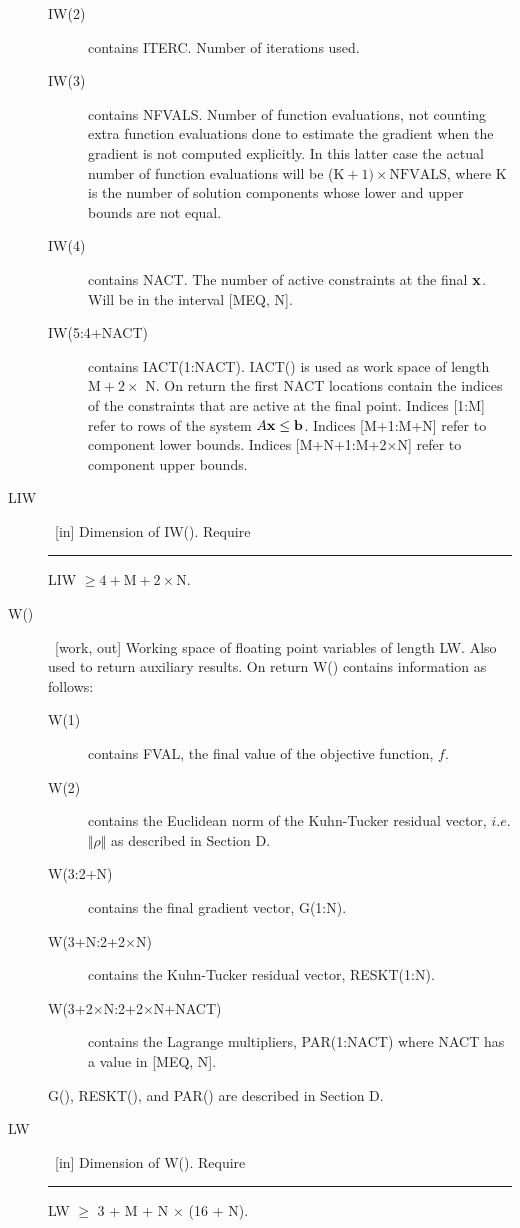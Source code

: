 \documentclass[twoside]{MATH77}
\begin{document}
\begin{description}
\begin{description}
\item[IW(2)]  contains ITERC. Number of iterations used.

\item[IW(3)]  contains NFVALS. Number of function evaluations, not counting
extra function evaluations done to estimate the gradient when the gradient
is not computed explicitly. In this latter case the actual number of
function evaluations will be ($\text{K}+1)\times \text{NFVALS}$, where K is the number
of solution components whose lower and upper bounds are not equal.

\item[IW(4)]  contains NACT. The number of active constraints at the final
${\bf x}$. Will be in the interval [MEQ, N].

\item[IW(5:4+NACT)]  contains IACT(1:NACT).\newline
IACT() is used as work space of length $\text{M} +2\times $ N. On return
the first NACT locations contain the
indices of the constraints that are active at the final point. Indices [1:M]
refer to rows of the system $A{\bf x} \leq  {\bf b}$. Indices [M+1:M+N]
refer to component lower bounds. Indices [M+N+1:M+2$\times $N] refer to
component upper bounds.
\end{description}

\item[LIW]  \ [in] Dimension of IW(). Require\newline
\rule{.4in}{0pt} LIW $\geq  4 + \text{M} + 2 \times \text{N}$.

\item[W()]  \ [work, out] Working space of floating point variables of
length LW. Also used to return auxiliary results. On return W() contains
information as follows:
\begin{description}
\item[W(1)] contains FVAL, the final value of the objective function, $f.$

\item[W(2)] contains the Euclidean norm of the Kuhn-Tucker residual vector, $i.e$. $%
\Vert \rho \Vert $ as described in Section D.

\item[W(3:2+N)] contains the final gradient vector, G(1:N).

\item[W(3+N:2+2$\times $N)] contains the Kuhn-Tucker residual vector, RESKT(1:N).

\item[W(3+2$\times $N:2+2$\times $N+NACT)] contains the Lagrange multipliers,
PAR(1:NACT) where NACT has a value in [MEQ, N].
\end{description}
G(), RESKT(), and PAR() are described in Section D.

\item[LW]  \ [in] Dimension of W(). Require\newline
\rule{.4in}{0pt} LW $\geq $ 3 + M + N $\times $ (16 + N).
\end{description}
\end{document}
